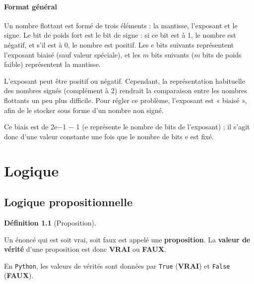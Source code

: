 \documentclass[
  letterpaper,
]{scrbook}
\theoremstyle{definition}
\theoremstyle{definition}
\newtheorem{definition}{Définition}[chapter]
\theoremstyle{plain}
\theoremstyle{remark}
\begin{document}
\hypertarget{format-guxe9nuxe9ral}{%
\subsubsection*{Format général}\label{format-guxe9nuxe9ral}}

Un nombre flottant est formé de trois éléments : la mantisse, l'exposant
et le signe. Le bit de poids fort est le bit de signe : si ce bit est à
1, le nombre est négatif, et s'il est à 0, le nombre est positif. Les
\(e\) bits suivants représentent l'exposant biaisé (sauf valeur
spéciale), et les \(m\) bits suivants (\(m\) bits de poids faible)
représentent la mantisse.

L'exposant peut être positif ou négatif. Cependant, la représentation
habituelle des nombres signés (complément à 2) rendrait la comparaison
entre les nombres flottants un peu plus difficile. Pour régler ce
problème, l'exposant est « biaisé », afin de le stocker sous forme d'un
nombre non signé.

Ce biais est de 2e−1 − 1 (e représente le nombre de bits de l'exposant)
; il s'agit donc d'une valeur constante une fois que le nombre de bits e
est fixé.


\hypertarget{logique}{%
\chapter{Logique}\label{logique}}

\hypertarget{logique-propositionnelle}{%
\section{Logique propositionnelle}\label{logique-propositionnelle}}

\leavevmode{}%
\begin{definition}[Proposition]\label{def-proposition}

Un énoncé qui est soit vrai, soit faux est appelé une
\textbf{proposition}. La \textbf{valeur de vérité} d'une proposition est
donc \textbf{VRAI} ou \textbf{FAUX}.

En \texttt{Python}, les valeurs de vérités sont données par
\texttt{True} (\textbf{VRAI}) et \texttt{False} (\textbf{FAUX}).

\end{definition}
\end{document}
